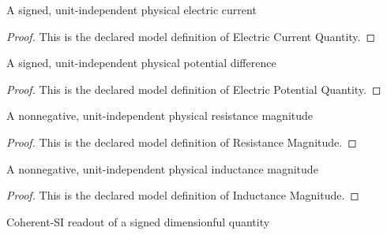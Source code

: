 \begin{definition}
  \label{def:physics:phyx-mini-0984:phyxminiproblems-problemphyxmini0984-electriccurrentquantity}
  A signed, unit-independent physical electric current
\end{definition}
\begin{proof}
  This is the declared model definition of Electric Current Quantity.
\end{proof}
\begin{definition}
  \label{def:physics:phyx-mini-0984:phyxminiproblems-problemphyxmini0984-electricpotentialquantity}
  A signed, unit-independent physical potential difference
\end{definition}
\begin{proof}
  This is the declared model definition of Electric Potential Quantity.
\end{proof}
\begin{definition}
  \label{def:physics:phyx-mini-0984:phyxminiproblems-problemphyxmini0984-resistancemagnitude}
  A nonnegative, unit-independent physical resistance magnitude
\end{definition}
\begin{proof}
  This is the declared model definition of Resistance Magnitude.
\end{proof}
\begin{definition}
  \label{def:physics:phyx-mini-0984:phyxminiproblems-problemphyxmini0984-inductancemagnitude}
  A nonnegative, unit-independent physical inductance magnitude
\end{definition}
\begin{proof}
  This is the declared model definition of Inductance Magnitude.
\end{proof}
\begin{definition}
  \label{def:physics:phyx-mini-0984:phyxminiproblems-problemphyxmini0984-signedsireadout}
  Coherent-SI readout of a signed dimensionful quantity
\end{definition}
